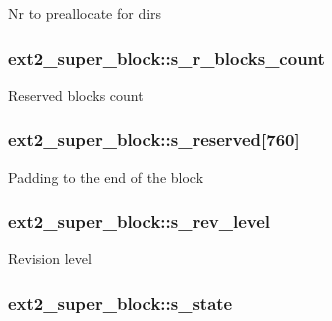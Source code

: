 Nr to preallocate for dirs \hypertarget{structext2__super__block_a660db33fc94622167793c6b080c515e4}{
\subsubsection[{s\-\_\-r\-\_\-blocks\-\_\-count}]{ ext2\-\_\-super\-\_\-block\-::s\-\_\-r\-\_\-blocks\-\_\-count}}\label{structext2__super__block_a660db33fc94622167793c6b080c515e4}
Reserved blocks count \hypertarget{structext2__super__block_a17e0d263a7fceb8b53aff24b66c216df}{
\subsubsection[{s\-\_\-reserved}]{ ext2\-\_\-super\-\_\-block\-::s\-\_\-reserved\mbox{[}760\mbox{]}}}\label{structext2__super__block_a17e0d263a7fceb8b53aff24b66c216df}
Padding to the end of the block \hypertarget{structext2__super__block_a70b07eaf44b6a5e777b8072ee4b593b4}{
\subsubsection[{s\-\_\-rev\-\_\-level}]{ ext2\-\_\-super\-\_\-block\-::s\-\_\-rev\-\_\-level}}\label{structext2__super__block_a70b07eaf44b6a5e777b8072ee4b593b4}
Revision level \hypertarget{structext2__super__block_a06b739ed98ef97510f193cb582e78eb6}{
\subsubsection[{s\-\_\-state}]{ ext2\-\_\-super\-\_\-block\-::s\-\_\-state}}\label{structext2__super__block_a06b739ed98ef97510f193cb582e78eb6}
